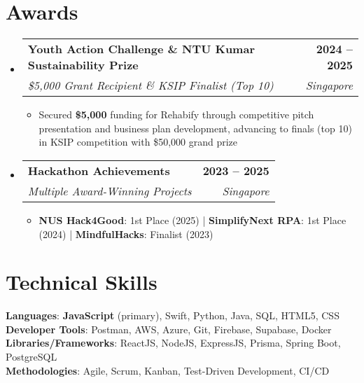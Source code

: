 \documentclass[letterpaper,11pt]{article}
\makeatletter
\newcommand{\resumeItem}[1]{
  \item\small{#1}
}
\newcommand{\resumeSubheading}[4]{
  \vspace{-2pt}\item
    \begin{tabular*}{1.0\textwidth}[t]{l@{\extracolsep{\fill}}r}
      \textbf{#1} & \textbf{\small #2} \\
      \textit{\small#3} & \textit{\small #4} \\
    \end{tabular*}\vspace{-7pt}
}
\newcommand{\resumeSubHeadingListStart}{\begin{itemize}[leftmargin=0.0in, label={}]}
\newcommand{\resumeSubHeadingListEnd}{\end{itemize}}
\newcommand{\resumeItemListStart}{\begin{itemize}}
\newcommand{\resumeItemListEnd}{\end{itemize}\vspace{-5pt}}
\makeatother
\begin{document}
\section{Awards}
    \resumeSubHeadingListStart
        \resumeSubheading
            {Youth Action Challenge \& NTU Kumar Sustainability Prize}{2024 -- 2025}
            {\$5,000 Grant Recipient \& KSIP Finalist (Top 10)}{Singapore}
            \resumeItemListStart
                \resumeItem{Secured \textbf{\$5,000} funding for Rehabify through competitive pitch presentation and business plan development, advancing to finals (top 10) in KSIP competition with \$50,000 grand prize}
            \resumeItemListEnd
            
        \resumeSubheading
            {Hackathon Achievements}{2023 -- 2025}
            {Multiple Award-Winning Projects}{Singapore}
            \resumeItemListStart
                \resumeItem{\textbf{NUS Hack4Good}: 1st Place (2025) | \textbf{SimplifyNext RPA}: 1st Place (2024) | \textbf{MindfulHacks}: Finalist (2023)}
            \resumeItemListEnd
    \resumeSubHeadingListEnd
\vspace{-16pt}

\section{Technical Skills}
 \begin{itemize}[leftmargin=0.15in, label={}]
    \small{\item{   
     \textbf{Languages}{: \textbf{JavaScript} (primary), Swift, Python, Java, SQL, HTML5, CSS} \\[1mm]
     \textbf{Developer Tools}{: Postman, AWS, Azure, Git, Firebase, Supabase, Docker} \\[1mm]
     \textbf{Libraries/Frameworks}{: ReactJS, NodeJS, ExpressJS, Prisma, Spring Boot, PostgreSQL} \\ [1mm]
     \textbf{Methodologies}{: Agile, Scrum, Kanban, Test-Driven Development, CI/CD} \\ [1mm]
    }}
 \end{itemize}
\vspace{-16pt}
\end{document}
